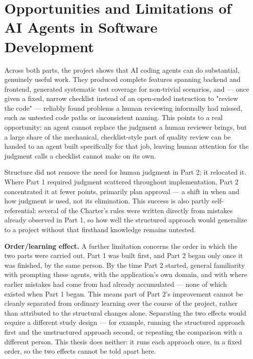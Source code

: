 \section{Opportunities and Limitations of AI Agents in Software Development}

Across both parts, the project shows that AI coding agents can do substantial, genuinely useful work. They produced complete features spanning backend and frontend, generated systematic test coverage for non-trivial scenarios, and --- once given a fixed, narrow checklist instead of an open-ended instruction to "review the code" --- reliably found problems a human reviewing informally had missed, such as untested code paths or inconsistent naming. This points to a real opportunity: an agent cannot replace the judgment a human reviewer brings, but a large share of the mechanical, checklist-style part of quality review can be handed to an agent built specifically for that job, leaving human attention for the judgment calls a checklist cannot make on its own.

Structure did not remove the need for human judgment in Part 2; it relocated it. Where Part 1 required judgment scattered throughout implementation, Part 2 concentrated it at fewer points, primarily plan approval --- a shift in when and how judgment is used, not its elimination. This success is also partly self-referential: several of the Charter's rules were written directly from mistakes already observed in Part 1, so how well the structured approach would generalize to a project without that firsthand knowledge remains untested.

\textbf{Order/learning effect.} A further limitation concerns the order in which the two parts were carried out. Part 1 was built first, and Part 2 began only once it was finished, by the same person. By the time Part 2 started, general familiarity with prompting these agents, with the application's own domain, and with where earlier mistakes had come from had already accumulated --- none of which existed when Part 1 began. This means part of Part 2's improvement cannot be cleanly separated from ordinary learning over the course of the project, rather than attributed to the structural changes alone. Separating the two effects would require a different study design --- for example, running the structured approach first and the unstructured approach second, or repeating the comparison with a different person. This thesis does neither: it runs each approach once, in a fixed order, so the two effects cannot be told apart here.

